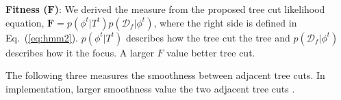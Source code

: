 \noindent\textbf{\normalsize Fitness ($\bm{F}$)}:
We derived the measure from the proposed tree cut likelihood equation, $\bm{F}=p({\phi}^t|T^t)p(\mathcal{D}_{f}|{\phi}^t)$,
where the right side is defined in Eq.~(\ref{eq:hmm2}).
$p({\phi}^t|T^t)$ describes how the tree cut  the tree and $p(\mathcal{D}_{f}|{\phi}^t)$ describes how it  the focus.
A larger  $F$ value  better tree cut.

The following three measures  the smoothness between  adjacent tree cuts.
In  implementation,  larger smoothness value  the two adjacent tree cuts .




